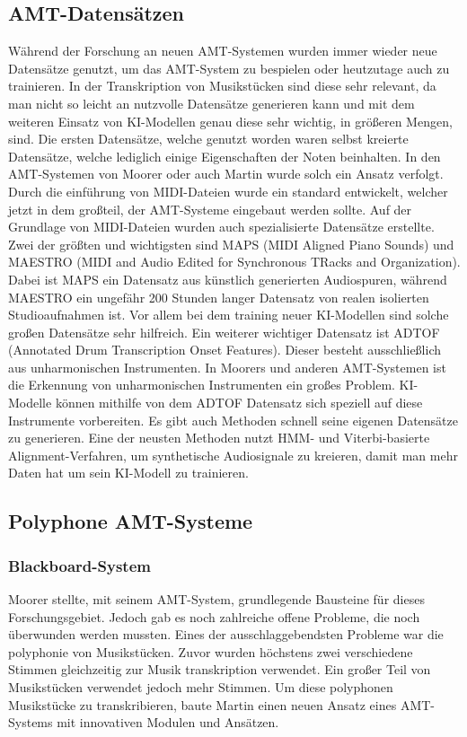 \subsection{AMT-Datensätzen}
Während der Forschung an neuen AMT-Systemen wurden immer wieder neue Datensätze genutzt,
um das AMT-System zu bespielen oder heutzutage auch zu trainieren.
In der Transkription von Musikstücken sind diese sehr relevant,
da man nicht so leicht an nutzvolle Datensätze generieren kann und
mit dem weiteren Einsatz von KI-Modellen genau diese sehr wichtig, in größeren Mengen, sind.
Die ersten Datensätze, welche genutzt worden waren selbst kreierte Datensätze,
welche lediglich einige Eigenschaften der Noten beinhalten.
In den AMT-Systemen von Moorer\cite{Moorer1977} oder auch Martin\cite{Martin1996} wurde solch ein Ansatz verfolgt.
Durch die einführung von MIDI-Dateien wurde ein standard entwickelt,
welcher jetzt in dem großteil, der AMT-Systeme eingebaut werden sollte.
Auf der Grundlage von MIDI-Dateien wurden auch spezialisierte Datensätze erstellte.
Zwei der größten und wichtigsten sind MAPS (MIDI Aligned Piano Sounds) und
MAESTRO (MIDI and Audio Edited for Synchronous TRacks and Organization).
Dabei ist MAPS ein Datensatz aus künstlich generierten Audiospuren,
während MAESTRO ein ungefähr 200 Stunden langer Datensatz von realen isolierten Studioaufnahmen ist.
Vor allem bei dem training neuer KI-Modellen sind solche großen Datensätze sehr hilfreich.
Ein weiterer wichtiger Datensatz ist ADTOF (Annotated Drum Transcription Onset Features).
Dieser besteht ausschließlich aus unharmonischen Instrumenten.
In Moorers und anderen AMT-Systemen ist die Erkennung von unharmonischen Instrumenten ein großes Problem.
KI-Modelle können mithilfe von dem ADTOF Datensatz sich speziell auf diese Instrumente vorbereiten.
Es gibt auch Methoden schnell seine eigenen Datensätze zu generieren.
Eine der neusten Methoden nutzt HMM- und Viterbi-basierte Alignment-Verfahren,
um synthetische Audiosignale zu kreieren, damit man mehr Daten hat um sein KI-Modell zu trainieren.
\cite{joysingh2019development}

\subsection{Polyphone AMT-Systeme}
\subsubsection{Blackboard-System}
Moorer stellte, mit seinem AMT-System, grundlegende Bausteine für dieses Forschungsgebiet.
Jedoch gab es noch zahlreiche offene Probleme, die noch überwunden werden mussten.
Eines der ausschlaggebendsten Probleme war die polyphonie von Musikstücken.
\cite{Martin1996}
Zuvor wurden höchstens zwei verschiedene Stimmen gleichzeitig zur Musik transkription verwendet.
Ein großer Teil von Musikstücken verwendet jedoch mehr Stimmen.
Um diese polyphonen Musikstücke zu transkribieren,
baute Martin einen neuen Ansatz eines AMT-Systems mit innovativen Modulen und Ansätzen.

